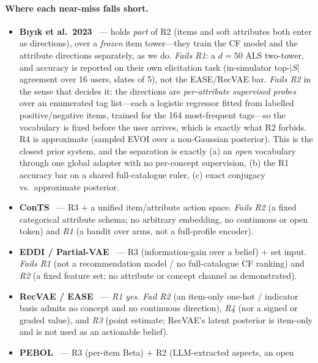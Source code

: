 \documentclass[11pt]{article}
\begin{document}
\paragraph{Where each near-miss falls short.}
\begin{itemize}[leftmargin=1.4em,itemsep=2pt]
  \item \textbf{B\i y\i k et al.~2023}~\cite{biyik2023soft} --- holds \emph{part} of R2 (items and soft attributes
        both enter as directions), over a \emph{frozen} item tower---they train the CF model
        and the attribute directions separately, as we do. \emph{Fails R1}: a $d{=}50$ ALS two-tower, and accuracy is
        reported on their own elicitation task (in-simulator top-$|S|$ agreement over 16 users, slates of 5), not the
        EASE/RecVAE bar. \emph{Fails R2} in the sense that decides it: the directions are \emph{per-attribute supervised
        probes} over an enumerated tag list---each a logistic regressor fitted from labelled positive/negative items,
        trained for the 164 most-frequent tags---so the vocabulary is fixed before the user arrives, which is exactly
        what R2 forbids. R4 is approximate (sampled EVOI over a non-Gaussian posterior). This is the closest prior system, and
        the separation is exactly (a) an \emph{open} vocabulary through one global adapter with no per-concept supervision,
        (b) the R1 accuracy bar on a shared full-catalogue ruler, (c) exact conjugacy vs.\ approximate posterior.
  \item \textbf{ConTS}~\cite{li2021seamlessly} --- R3 $+$ a unified item/attribute action space.
        \emph{Fails R2} (a fixed categorical attribute schema; no arbitrary embedding, no continuous or open token) and
        \emph{R1} (a bandit over arms, not a full-profile encoder).
  \item \textbf{EDDI / Partial-VAE}~\cite{ma2019eddi} --- R3 (information-gain over a belief) $+$ set input.
        \emph{Fails R1} (not a recommendation model / no full-catalogue CF ranking) and \emph{R2} (a fixed feature set; no attribute or
        concept channel as demonstrated).
  \item \textbf{RecVAE / EASE}~\cite{ren2020recvae,steck2019ease} --- \emph{R1 yes.} \emph{Fail R2} (an item-only
        one-hot / indicator basis admits no concept and no continuous direction), \emph{R4} (nor a signed or graded
        value), and \emph{R3} (point estimate; RecVAE's latent posterior is item-only and is not used as an actionable
        belief).
  \item \textbf{PEBOL}~\cite{austin2024bayesian} --- R3 (per-item Beta) $+$ R2 (LLM-extracted aspects, an open

\end{itemize}
\end{document}
